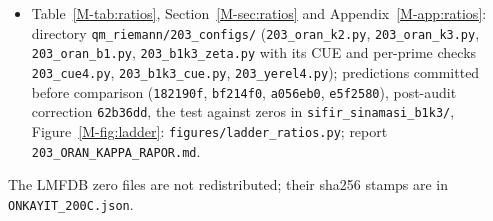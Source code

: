 \documentclass[12pt]{amsart}
\theoremstyle{remark}
\newcommand{\1}{\mathbf{1}}
\begin{document}
\begin{itemize}
\item Table~\ref{M-tab:ratios}, Section~\ref{M-sec:ratios} and
Appendix~\ref{M-app:ratios}: directory
\nolinkurl{qm_riemann/203_configs/} (\nolinkurl{203_oran_k2.py},
\nolinkurl{203_oran_k3.py}, \nolinkurl{203_oran_b1.py},
\nolinkurl{203_b1k3_zeta.py} with its CUE and per-prime checks
\nolinkurl{203_cue4.py}, \nolinkurl{203_b1k3_cue.py},
\nolinkurl{203_yerel4.py}); predictions committed before comparison
(\texttt{182190f}, \texttt{bf214f0}, \texttt{a056eb0}, \texttt{e5f2580}),
post-audit correction \texttt{62b36dd}, the test against zeros in
\nolinkurl{sifir_sinamasi_b1k3/}, Figure~\ref{M-fig:ladder}:
\nolinkurl{figures/ladder_ratios.py}; report
\nolinkurl{203_ORAN_KAPPA_RAPOR.md}.
\end{itemize}
The LMFDB zero files are not redistributed; their sha256 stamps are in
\texttt{ONKAYIT\_200C.json}.
\end{document}
